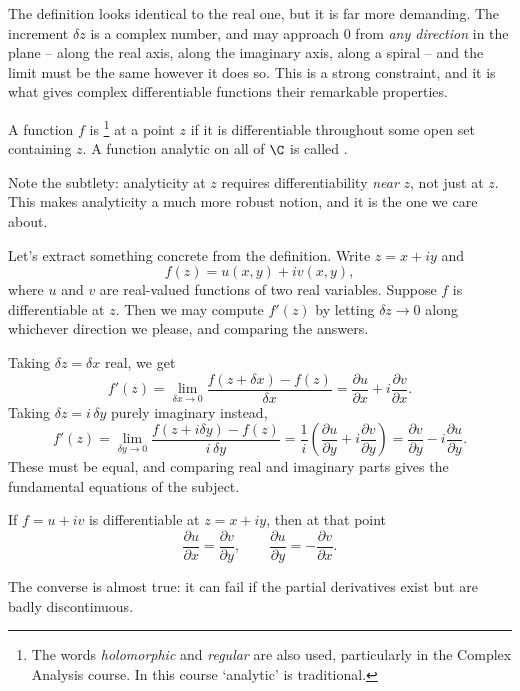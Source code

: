 The definition looks identical to the real one, but it is far more demanding. The increment $\delta z$ is a complex number, and may approach $0$ from \emph{any direction} in the plane -- along the real axis, along the imaginary axis, along a spiral -- and the limit must be the same however it does so. This is a strong constraint, and it is what gives complex differentiable functions their remarkable properties.

\begin{definition}
	A function $f$ is \footnote{The words \emph{holomorphic} and \emph{regular} are also used, particularly in the Complex Analysis course. In this course `analytic' is traditional.} at a point $z$ if it is differentiable throughout some open set containing $z$. A function analytic on all of $\C$ is called .
\end{definition}

Note the subtlety: analyticity at $z$ requires differentiability \emph{near} $z$, not just at $z$. This makes analyticity a much more robust notion, and it is the one we care about.

Let's extract something concrete from the definition. Write $z = x + iy$ and
$$
f(z) = u(x, y) + i v(x, y),
$$
where $u$ and $v$ are real-valued functions of two real variables. Suppose $f$ is differentiable at $z$. Then we may compute $f'(z)$ by letting $\delta z \to 0$ along whichever direction we please, and comparing the answers.

Taking $\delta z = \delta x$ real, we get
$$
f'(z) = \lim_{\delta x \to 0} \frac{f(z + \delta x) - f(z)}{\delta x} = \frac{\partial u}{\partial x} + i \frac{\partial v}{\partial x}.
$$
Taking $\delta z = i \, \delta y$ purely imaginary instead,
$$
f'(z) = \lim_{\delta y \to 0} \frac{f(z + i\delta y) - f(z)}{i \, \delta y} = \frac{1}{i}\left(\frac{\partial u}{\partial y} + i \frac{\partial v}{\partial y}\right) = \frac{\partial v}{\partial y} - i \frac{\partial u}{\partial y}.
$$
These must be equal, and comparing real and imaginary parts gives the fundamental equations of the subject.

\begin{theorem}
	If $f = u + iv$ is differentiable at $z = x + iy$, then at that point
	$$
	\frac{\partial u}{\partial x} = \frac{\partial v}{\partial y}, \qquad \frac{\partial u}{\partial y} = -\frac{\partial v}{\partial x}.
	$$
\end{theorem}

The converse is almost true: it can fail if the partial derivatives exist but are badly discontinuous.

